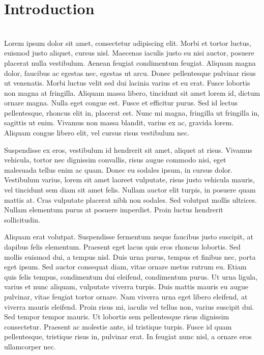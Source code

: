 
\renewcommand{\chapterauthor}{I. P. Daly and Amanda Hugginkiss}
\renewcommand{\shortchaptertitle}{Introduction}
\chapter*{Introduction}
\label{ch:intro}


\mbox{ } \\[48pt]

\noindent Lorem ipsum dolor sit amet, consectetur adipiscing elit. Morbi et tortor luctus,
euismod justo aliquet, cursus nisl. Maecenas iaculis justo eu nisi auctor,
posuere placerat nulla vestibulum. Aenean feugiat condimentum feugiat. Aliquam
magna dolor, faucibus ac egestas nec, egestas ut arcu. Donec pellentesque
pulvinar risus ut venenatis. Morbi luctus velit sed dui lacinia varius et eu
erat. Fusce lobortis non magna at fringilla. Aliquam massa libero, tincidunt sit
amet lorem id, dictum ornare magna. Nulla eget congue est. Fusce et efficitur
purus. Sed id lectus pellentesque, rhoncus elit in, placerat est. Nunc mi magna,
fringilla ut fringilla in, sagittis ut enim. Vivamus non massa blandit, varius
ex ac, gravida lorem. Aliquam congue libero elit, vel cursus risus vestibulum
nec.

Suspendisse ex eros, vestibulum id hendrerit sit amet, aliquet at risus. Vivamus
vehicula, tortor nec dignissim convallis, risus augue commodo nisi, eget
malesuada tellus enim ac quam. Donec eu sodales ipsum, in cursus
dolor. Vestibulum varius, lorem sit amet laoreet vulputate, risus justo vehicula
mauris, vel tincidunt sem diam sit amet felis. Nullam auctor elit turpis, in
posuere quam mattis at. Cras vulputate placerat nibh non sodales. Sed volutpat
mollis ultrices. Nullam elementum purus at posuere imperdiet. Proin luctus
hendrerit sollicitudin.

Aliquam erat volutpat. Suspendisse fermentum neque faucibus justo suscipit, at
dapibus felis elementum. Praesent eget lacus quis eros rhoncus lobortis. Sed
mollis euismod dui, a tempus nisl. Duis urna purus, tempus et finibus nec, porta
eget ipsum. Sed auctor consequat diam, vitae ornare metus rutrum eu. Etiam quis
felis tempus, condimentum dui eleifend, condimentum purus. Ut urna ligula,
varius et nunc aliquam, vulputate viverra turpis. Duis mattis mauris eu augue
pulvinar, vitae feugiat tortor ornare. Nam viverra urna eget libero eleifend, at
viverra mauris eleifend. Proin risus mi, iaculis vel tellus non, varius suscipit
dui. Sed tempor tempor mauris. Ut lobortis sem pellentesque risus dignissim
consectetur. Praesent ac molestie ante, id tristique turpis. Fusce id quam
pellentesque, tristique risus in, pulvinar erat. In feugiat nunc nisl, a ornare
eros ullamcorper nec.

